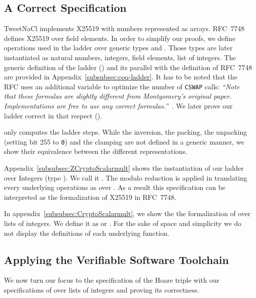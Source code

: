 \subsection{A Correct Specification}
\label{subsec:spec-rfc}

TweetNaCl implements X25519 with numbers represented as arrays.
RFC~7748 defines X25519 over field elements. In order to simplify our proofs,
we define operations used in the ladder over generic types
 and . Those types are later instantiated as natural numbers,
integers, field elements, list of integers.
The generic definition of the ladder () and its parallel with
the definition of RFC~7748 are provided in Appendix~\ref{subsubsec:coq-ladder}.
It has to be noted that the RFC uses an additional variable to optimize the number
of \texttt{CSWAP} calls:
\emph{``Note that these formulas are slightly different from Montgomery's
original paper.  Implementations are free to use any correct formulas.''}~\cite{rfc7748}.
We later prove our ladder correct in that respect ().

 only computes the ladder steps.
While the inversion, the packing, the unpacking (setting bit 255 to \texttt{0})
and the clamping are not defined in a generic manner, we show their equivalence
between the different representations.

Appendix~\ref{subsubsec:ZCryptoScalarmult} shows the instantiation of our ladder
over Integers (type ). We call it .
The modulo reduction is applied in  translating every
underlying operations as over \Zfield. As a result this specification can be
interpreted as the formalization of X25519 in RFC~7748.

In appendix~\ref{subsubsec:CryptoScalarmult}, we show the the formalization of
 over lists of integers. We define it as
 or . For the sake of space and simplicity we
do not display the definitions of each underlying function.






\subsection{Applying the Verifiable Software Toolchain}
\label{subsec:with-VST}

We now turn our focus to the specification of the Hoare triple with our
specifications of  over lists of integers and proving
its correctness.

